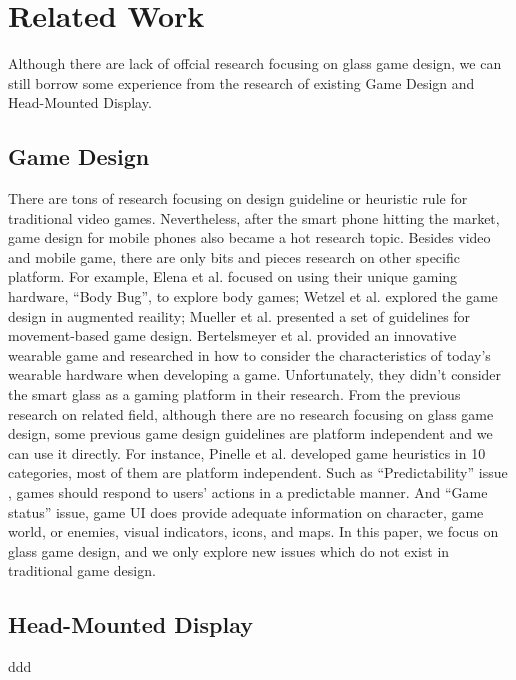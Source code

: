 \section{Related Work}

Although there are lack of offcial research focusing on glass game design, we can still borrow some experience from the research of existing Game Design and Head-Mounted Display.

\subsection{Game Design}

There are tons of research focusing on design guideline or heuristic rule for traditional video games\cite{gameflow,criticalreview,chi04game,09game,02game,08game,07game}. Nevertheless, after the smart phone hitting the market, game design for mobile phones also became a hot research topic\cite{mobilegame,mobile06,mobile08,icec06}. Besides video and mobile game, there are only bits and pieces research on other specific platform. For example, Elena et al. focused on using their unique gaming hardware, ``Body Bug'', to explore body games\cite{bodygame}; Wetzel et al. explored the game design in augmented reaility\cite{argame}; Mueller et al. presented a set of guidelines for movement-based game design\cite{movegame}. Bertelsmeyer et al. provided an innovative wearable game and researched in how to consider the characteristics of today's wearable hardware when developing a game\cite{wearable}. Unfortunately, they didn't consider the smart glass as a gaming platform in their research. 
From the previous research on related field, although there are no research focusing on glass game design, some previous game design guidelines are platform independent and we can use it directly. For instance, Pinelle et al.\cite{videogame} developed game heuristics in 10 categories, most of them are platform independent. 
Such as ``Predictability'' issue , games should respond to users' actions in a predictable manner. And ``Game status'' issue, game UI does provide adequate information on character, game world, or enemies, visual indicators, icons, and maps. 
In this paper, we focus on glass game design, and we only explore new issues which do not exist in traditional game design.


\subsection{Head-Mounted Display}
ddd